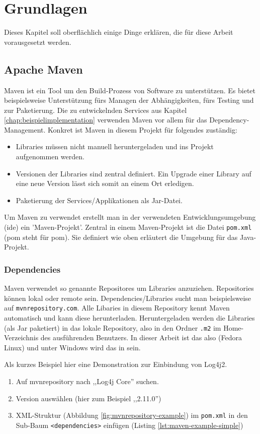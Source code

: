 \chapter{Grundlagen}
\label{chap:voraussetzungen}
Dieses Kapitel soll oberflächlich einige Dinge erklären, die für diese Arbeit vorausgesetzt werden.
\section{Apache Maven}
\label{chap:maven}
Maven ist ein Tool um den Build-Prozess von Software zu unterstützen. Es bietet beispielsweise Unterstützung fürs Managen der Abhängigkeiten, fürs Testing und zur Paketierung. Die zu entwickelnden Services aus Kapitel \ref{chap:beispielimplementation} verwenden Maven vor allem für das Dependency-Management. Konkret ist Maven in diesem Projekt für folgendes zuständig:
\begin{itemize}
	\item
	Libraries müssen nicht manuell heruntergeladen und ins Projekt aufgenommen werden.
	\item
	Versionen der Libraries sind zentral definiert. Ein Upgrade einer Library auf eine neue Version lässt sich somit an einem Ort erledigen.
	\item
	Paketierung der Services/Applikationen als Jar-Datei.
\end{itemize}
Um Maven zu verwendet erstellt man in der verwendeten Entwicklungsumgebung (\acrshort{ide}) ein 'Maven-Projekt'. Zentral in einem Maven-Projekt ist die Datei \texttt{pom.xml} (\acrshort{pom} steht für \acrlong{pom}). Sie definiert wie oben erläutert die Umgebung für das Java-Projekt.

\subsection{Dependencies}
Maven verwendet so genannte Repositores um Libraries anzuziehen. Repositories können lokal oder remote sein. Dependencies/Libraries sucht man beispielsweise auf \texttt{mvnrepository.com}. Alle Libaries in diesem Repository kennt Maven automatisch und kann diese herunterladen. Heruntergeladen werden die Libraries (als Jar paketiert) in das lokale Repository, also in den Ordner \texttt{.m2} im Home-Verzeichnis des ausführenden Benutzers. In dieser Arbeit ist das also  (Fedora Linux) und unter Windows wird das in  sein.

Als kurzes Beispiel hier eine Demonstration zur Einbindung von Log4j2.
\begin{enumerate}
	\item Auf mvnrepository nach ,,Log4j Core'' suchen.
	\item Version auswählen (hier zum Beispiel ,,2.11.0'')
	\item XML-Struktur (Abbildung \ref{fig:mvnrepository-example}) im \texttt{pom.xml} in den Sub-Baum \texttt{<dependencies>} einfügen (Listing \ref{lst:maven-example-simple})
\end{enumerate}

